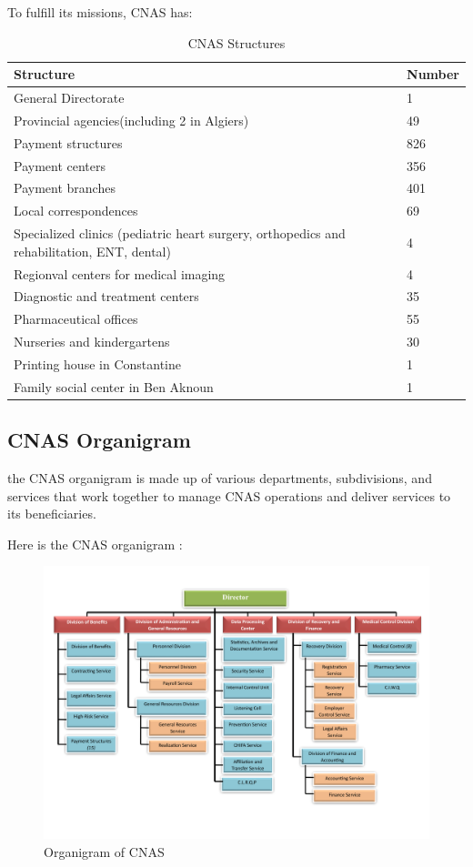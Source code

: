 \medskip To fulfill its missions, CNAS has: 
\begin{table}[htbp]
  \centering
  \begin{tabular}{|p{10cm}|l|}
  \hline
  \textbf{Structure} & \textbf{Number} \\
  \hline
  General Directorate & 1 \\
  \hline
  Provincial agencies(including 2 in Algiers)  & 49 \\
  \hline
  Payment structures & 826 \\
  \hline
  Payment centers & 356 \\
  \hline
  Payment branches & 401 \\
  \hline
  Local correspondences & 69 \\
  \hline
  Specialized clinics (pediatric heart surgery, orthopedics and rehabilitation, ENT, dental) & 4 \\
  \hline
  Regionval centers for medical imaging & 4 \\
  \hline
  Diagnostic and treatment centers & 35 \\
  \hline
  Pharmaceutical offices & 55 \\
  \hline
  Nurseries and kindergartens & 30 \\
  \hline
  Printing house in Constantine & 1 \\
  \hline
  Family social center in Ben Aknoun & 1 \\
  \hline
  \end{tabular}
  \caption{CNAS Structures}
  \end{table}

\newpage
\subsection{CNAS Organigram}
the CNAS organigram is made up of various departments, subdivisions, and services that work together to manage CNAS operations and deliver services to its beneficiaries.


\medskip

Here is the CNAS organigram : 
\begin{figure}[h]
  \centering
  \includegraphics[width=1.0\textwidth]{cnas organigramme-1.png}
  \caption{Organigram of CNAS}
  \label{fig:organigram}
\end{figure}
